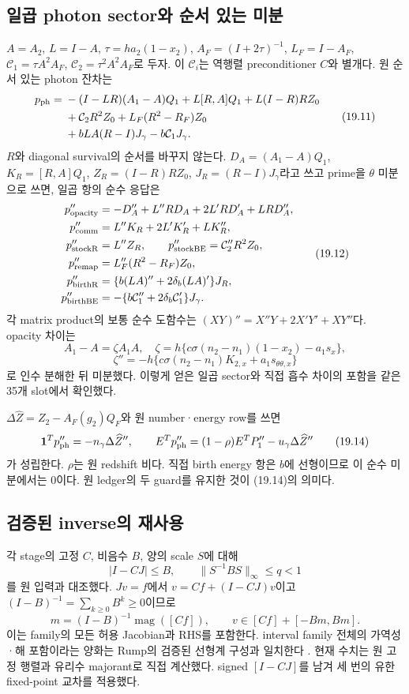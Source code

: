 \subsection{일곱 photon sector와 순서 있는 미분}
$A=A_2$, $L=I-A$, $\tau=ha_2(1-x_2)$,
$A_F=(I+2\tau)^{-1}$,
$L_F=I-A_F$,
$\mathcal C_1=\tau A^2A_F$,
$\mathcal C_2=\tau^2A^2A_F$로 두자.
이 $\mathcal C_i$는 역행렬 preconditioner $C$와 별개다.
원 순서 있는 photon 잔차는
\[
\begin{aligned}
p_{\rm ph}={}&-(I-LR)(A_1-A)Q_1+L[R,A]Q_1
+L(I-R)RZ_0\\
&+\mathcal C_2R^2Z_0+L_F(R^2-R_F)Z_0\\
&+bLA(R-I)J_\gamma-b\mathcal C_1J_\gamma.
\end{aligned}
\tag{19.11}
\]
$R$와 diagonal survival의 순서를 바꾸지 않는다.
$D_A=(A_1-A)Q_1$,
$K_R=[R,A]Q_1$,
$Z_R=(I-R)RZ_0$,
$J_R=(R-I)J_\gamma$라고 쓰고 prime을 $\theta$ 미분으로 쓰면,
일곱 항의 순수 응답은
\[
\begin{aligned}
p_{\rm opacity}''&=-D_A''+L''RD_A+2L'RD_A'+LRD_A'',\\
p_{\rm comm}''&=L''K_R+2L'K_R'+LK_R'',\\
p_{\rm stockR}''&=L''Z_R,\qquad
p_{\rm stockBE}''=\mathcal C_2''R^2Z_0,\\
p_{\rm remap}''&=L_F''(R^2-R_F)Z_0,\\
p_{\rm birthR}''&=\{b(LA)''+2\delta_b(LA)'\}J_R,\\
p_{\rm birthBE}''&=-\{b\mathcal C_1''+2\delta_b\mathcal C_1'\}J_\gamma.
\end{aligned}
\tag{19.12}
\]
각 matrix product의 보통 순수 도함수는
$(XY)''=X''Y+2X'Y'+XY''$다.
opacity 차이는
\[
A_1-A=\zeta A_1A,\quad
\zeta=h\{c\sigma(n_2-n_1)(1-x_2)-a_1s_x\},
\]
\[
\zeta''=-h\{c\sigma(n_2-n_1)K_{2,x}+a_1s_{\theta\theta,x}\}
\tag{19.13}
\]
로 인수 분해한 뒤 미분했다.
이렇게 얻은 일곱 sector와 직접 흡수 차이의 포함을 같은 35개 slot에서 확인했다.

$\Delta\widehat Z=Z_2-A_F(g_2)Q_F$와 원 number·energy row를 쓰면
\[
\mathbf1^Tp_{\rm ph}''=-n_\gamma\Delta\widehat Z'',\qquad
E^Tp_{\rm ph}''=(1-\rho)E^TP_1''-u_\gamma\Delta\widehat Z''
\tag{19.14}
\]
가 성립한다. $\rho$는 원 redshift 비다.
직접 birth energy 항은 $b$에 선형이므로 이 순수 미분에서는 0이다.
원 ledger의 두 guard를 유지한 것이 (19.14)의 의미다.

\subsection{검증된 inverse의 재사용}
각 stage의 고정 $C$, 비음수 $B$, 양의 scale $S$에 대해
\[
|I-CJ|\le B,\qquad \|S^{-1}BS\|_\infty\le q<1
\tag{19.15}
\]
를 원 입력과 대조했다.
$Jv=f$에서 $v=Cf+(I-CJ)v$이고
$(I-B)^{-1}=\sum_{k\ge0}B^k\ge0$이므로
\[
m=(I-B)^{-1}\operatorname{mag}([Cf]),\qquad
\boxed{v\in[Cf]+[-Bm,Bm]}.
\tag{19.16}
\]
이는 family의 모든 허용 Jacobian과 RHS를 포함한다.
interval family 전체의 가역성·해 포함이라는 양화는 Rump의
검증된 선형계 구성과 일치한다 \cite{R99}.
현재 수치는 원 고정 행렬과 유리수 majorant로 직접 계산했다.
signed $[I-CJ]$를 남겨 세 번의 유한 fixed-point 교차를 적용했다.

